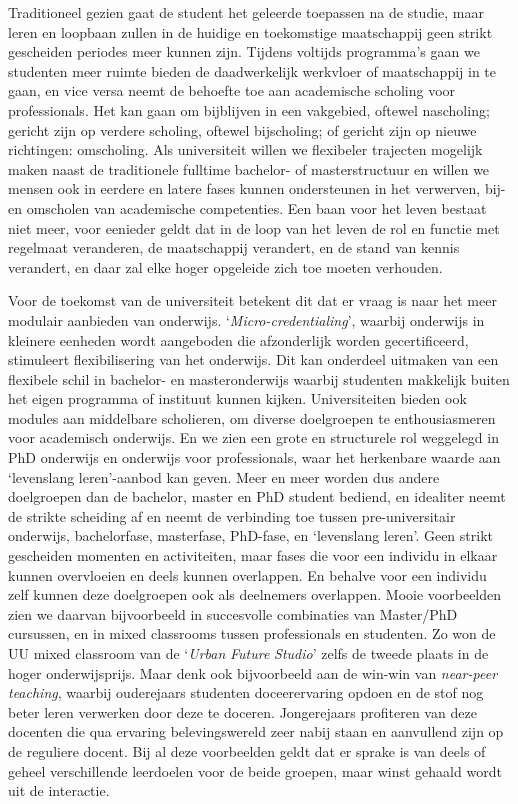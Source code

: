 \documentclass[smallauthor, chapterhaspagenum, nochapterinheader, pagenuminheader,  bigchapnum,medium2, tocpages,  garamond, titleinheader]{jote-book}
\begin{document}
	Traditioneel gezien gaat de student het geleerde toepassen na de studie, maar leren en loopbaan zullen in de huidige en toekomstige maatschappij geen strikt gescheiden periodes meer kunnen zijn. Tijdens voltijds programma's gaan we studenten meer ruimte bieden de daadwerkelijk werkvloer of maatschappij in te gaan, en vice versa neemt de behoefte toe aan academische scholing voor professionals. Het kan gaan om bijblijven in een vakgebied, oftewel nascholing; gericht zijn op verdere scholing, oftewel bijscholing; of gericht zijn op nieuwe richtingen: omscholing. Als universiteit willen we flexibeler trajecten mogelijk maken naast de traditionele fulltime bachelor- of masterstructuur en willen we mensen ook in eerdere en latere fases kunnen ondersteunen in het verwerven, bij- en omscholen van academische competenties. Een baan voor het leven bestaat niet meer, voor eenieder geldt dat in de loop van het leven de rol en functie met regelmaat veranderen, de maatschappij verandert, en de stand van kennis verandert, en daar zal elke hoger opgeleide zich toe moeten verhouden.



	Voor de toekomst van de universiteit betekent dit dat er vraag is naar het meer modulair aanbieden van onderwijs. ‘\emph{Micro-}\emph{credentialing}', waarbij onderwijs in kleinere eenheden wordt aangeboden die afzonderlijk worden gecertificeerd, stimuleert flexibilisering van het onderwijs. Dit kan onderdeel uitmaken van een flexibele schil in bachelor- en masteronderwijs waarbij studenten makkelijk buiten het eigen programma of instituut kunnen kijken. Universiteiten bieden ook modules aan middelbare scholieren, om diverse doelgroepen te enthousiasmeren voor academisch onderwijs. En we zien een grote en structurele rol weggelegd in PhD onderwijs en onderwijs voor professionals, waar het herkenbare waarde aan ‘levenslang leren'-aanbod kan geven. Meer en meer worden dus andere doelgroepen dan de bachelor, master en PhD student bediend, en idealiter neemt de strikte scheiding af en neemt de verbinding toe tussen pre-universitair onderwijs, bachelorfase, masterfase, PhD-fase, en ‘levenslang leren'. Geen strikt gescheiden momenten en activiteiten, maar fases die voor een individu in elkaar kunnen overvloeien en deels kunnen overlappen. En behalve voor een individu zelf kunnen deze doelgroepen ook als deelnemers overlappen. Mooie voorbeelden zien we daarvan bijvoorbeeld in succesvolle combinaties van Master/PhD cursussen, en in mixed classrooms tussen professionals en studenten. Zo won de UU mixed classroom van de ‘\emph{Urban }\emph{Future}\emph{ Studio}' zelfs de tweede plaats in de hoger onderwijsprijs. Maar denk ook bijvoorbeeld aan de win-win van \emph{near}\emph{-peer teaching}, waarbij ouderejaars studenten doceerervaring opdoen en de stof nog beter leren verwerken door deze te doceren. Jongerejaars profiteren van deze docenten die qua ervaring belevingswereld zeer nabij staan en aanvullend zijn op de reguliere docent. Bij al deze voorbeelden geldt dat er sprake is van deels of geheel verschillende leerdoelen voor de beide groepen, maar winst gehaald wordt uit de interactie.
\end{document}
